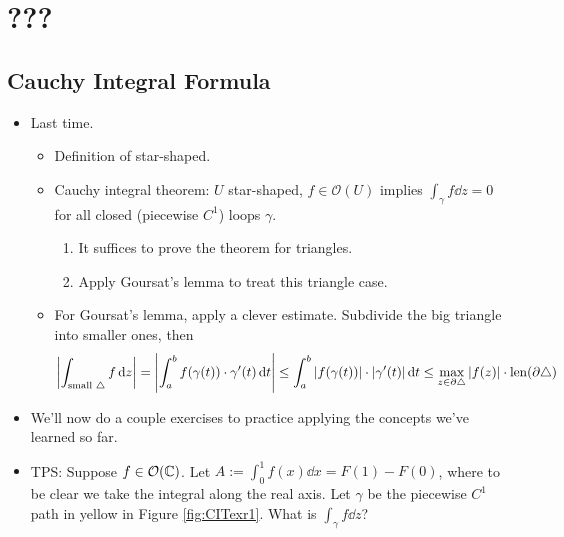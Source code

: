 \documentclass[../notes.tex]{subfiles}
\begin{document}
\chapter{???}
\section{Cauchy Integral Formula}
\begin{itemize}
    \item {}Last time.
    \begin{itemize}
        \item Definition of star-shaped.
        \item Cauchy integral theorem: $U$ star-shaped, $f\in\mathcal{O}(U)$ implies $\int_\gamma f\dd{z}=0$ for all closed (piecewise $C^1$) loops $\gamma$.
        \begin{enumerate}
            \item It suffices to prove the theorem for triangles.
            \item Apply Goursat's lemma to treat this triangle case.
        \end{enumerate}
        \item For Goursat's lemma, apply a clever estimate. Subdivide the big triangle into smaller ones, then
        \begin{align*}
            \left| \int_{\text{small }\triangle} f\dd{z} \right| = \left| \int_a^bf(\gamma(t))\cdot\gamma'(t)\dd{t} \right|
            \leq \int_a^b|f(\gamma(t))|\cdot|\gamma'(t)|\dd{t}
            \leq \max_{z\in\partial\triangle}|f(z)|\cdot\operatorname{len}(\partial\triangle)
        \end{align*}
    \end{itemize}
    \item We'll now do a couple exercises to practice applying the concepts we've learned so far.
    \item TPS: Suppose $f\in\mathcal{O}(\mathbb{C})$. Let $A:=\int_0^1f(x)\dd{x}=F(1)-F(0)$, where to be clear we take the integral along the real axis. Let $\gamma$ be the piecewise $C^1$ path in yellow in Figure \ref{fig:CITexr1}. What is $\int_\gamma f\dd{z}$?
    \begin{figure}[h!]
        \centering
\end{figure}
\end{itemize}
\end{document}
